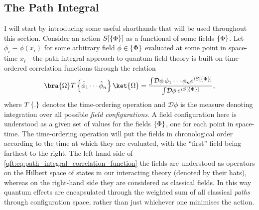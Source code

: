 \documentclass[../main.tex]{subfiles}
\begin{document}
\subsection{The Path Integral}
I will start by introducing some useful shorthands that will be used throughout this section.
Consider an action \(S[\left\{\Phi\right\}]\) as a functional of some fields \(\left\{\Phi\right\}\). Let \(\phi_i \equiv \phi(x_i)\) for some arbitrary field \(\phi \in \left\{\Phi\right\}\) evaluated at some point in space-time \(x_i\)---the path integral approach to quantum field theory is built on time-ordered correlation functions through the relation\needcite\
\begin{equation}
  \label{qft:eq:path_integral_correlation_function}
  \bra{\Omega} T\cclosed{\hat\phi_1 \cdots \hat\phi_n} \ket{\Omega} = \frac{\int\!\mathcal{D}\phi\, \phi_1 \cdots \phi_n \exp{iS[\cclosed{\Phi}]}}{\int\!\mathcal{D}\phi\, \exp{iS[\cclosed{\Phi}]}},
\end{equation}
where \(T\left\{.\right\}\) denotes the time-ordering operation and \(\mathcal{D}\phi\) is the measure denoting integration over all possible \emph{field configurations}.
A field configuration here is understood as a given set of values for the fields \(\left\{\Phi\right\}\), one for each point in space-time.
The time-ordering operation will put the fields in chronological order according to the time at which they are evaluated, with the ``first'' field being farthest to the right.
The left-hand side of \cref{qft:eq:path_integral_correlation_function} the fields are understood as operators on the Hilbert space of states in our interacting theory (denoted by their hats), whereas on the right-hand side they are considered as classical fields.
In this way quantum effects are encapsulated through the weighted sum of all classical \emph{paths} through configuration space, rather than just whichever one minimises the action.
\end{document}
